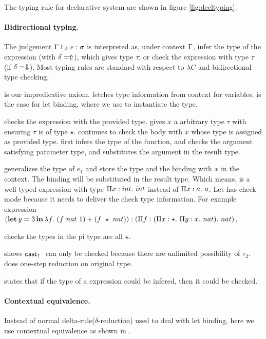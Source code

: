 The typing rule for declarative system are shown in figure \ref{fig:decltyping}.

\paragraph{Bidirectional typing.} The judgement $\preall e:\sigma \trto t$ is interpreted as, under context $\ctx$, infer the type of the expression (with $\delta=\Inf$), which gives type $\tau$; or check the expression with type $\tau$ (if $\delta = \Chk$). Most typing rules are standard with respect to $\lambda C$ and bidirectional type checking.

 is our impredicative axiom.  fetches type information from context for variables.  is the case for let binding, where we use  to instantiate the type.

 checks the expression with the provided type.  gives $x$ a arbitrary type $\tau$ with ensuring $\tau$ is of type $\star$.  continues to check the body with $x$ whose type is assigned as provided type.  first infers the type of the function, and checks the argument satisfying parameter type, and substitutes the argument in the result type.

 generalizes the type of $e_1$ and store the type and the binding with $x$ in the context. The binding will be substituted in the result type. Which means,  is a well typed expression with type $\bpi x {int} {int}$ instead of $\bpi x a a $. Let has check mode because it needs to deliver the check type information. For example expression $(\kw{let} y = 3 \kw{in} \erlam f {(f~nat~1) + (f~\star~nat))}: (\bpi f {(\bpi x \star {\bpi y x nat})} nat)$.

 checks the types in the pi type are all $\star$.

 shows $\ercastup$ can only be checked because there are unlimited possibility of $\tau_2$.  does one-step reduction on original type.

 states that if the type of a expression could be infered, then it could be checked.

\paragraph{Contextual equivalence.} Instead of normal delta-rule($\delta$-reduction) used to deal with let binding, here we use contextual equivalence as shown in .

